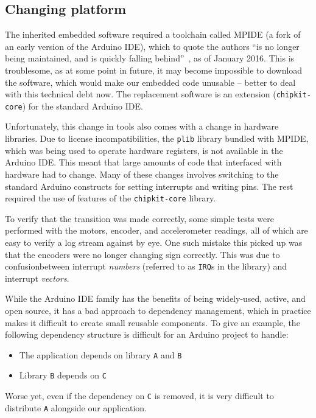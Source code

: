 \documentclass[main.tex]{subfiles}
\begin{document}
\subsection{Changing platform}
\label{sec:platformio}

	The inherited embedded software required a toolchain called MPIDE (a fork of an early version of the Arduino IDE), which to quote the authors \enquote{is no longer being maintained, and is quickly falling behind}~\cite{ mpide}, as of January 2016. This is troublesome, as at some point in future, it may become impossible to download the software, which would make our embedded code unusable -- better to deal with this technical debt now. The replacement software is an extension (\texttt{chipkit-core}) for the standard Arduino IDE.

	Unfortunately, this change in tools also comes with a change in hardware libraries.
	Due to license incompatibilities, the \texttt{plib} library bundled with MPIDE, which was being used to operate hardware registers, is not available in the Arduino IDE.
	This meant that large amounts of code that interfaced with hardware had to change. Many of these changes involves switching to the standard Arduino constructs for setting interrupts and writing pins.
	The rest required the use of features of the \texttt{chipkit-core} library.

	To verify that the transition was made correctly, some simple tests were performed with the motors, encoder, and accelerometer readings, all of which are easy to verify a log stream against by eye. One such mistake this picked up was that the encoders were no longer changing sign correctly.
	This was due to confusion\footnotemark between interrupt \emph{numbers} (referred to as \texttt{IRQ}s in the library) and interrupt \emph{vectors}.


	While the Arduino IDE family has the benefits of being widely-used, active, and open source, it has a bad approach to dependency management, which in practice makes it difficult to create small reusable components.
	To give an example, the following dependency structure is difficult for an Arduino project to handle:
	\begin{itemize}[noitemsep]
		\item The application depends on library \texttt{A} and \texttt{B}
		\item Library \texttt{B} depends on \texttt{C}
	\end{itemize}
	Worse yet, even if the dependency on \texttt{C} is removed, it is very difficult to distribute \texttt{A} alongside our application.
\end{document}
